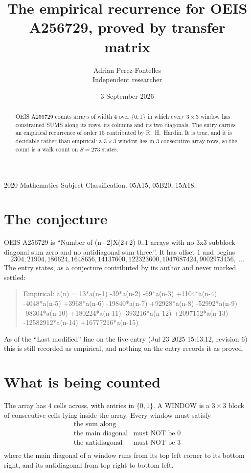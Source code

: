\documentclass[11pt,a4paper]{article}
\title{The empirical recurrence for OEIS A256729, proved by transfer matrix}
\author{Adrian Perez Fontelles\\ \small Independent researcher}
\date{3 September 2026}
\theoremstyle{plain}
\theoremstyle{definition}
\begin{document}
\maketitle

\begin{abstract}
OEIS A256729 counts arrays of width $4$ over $\{0,1\}$ in which every $3\times3$ window has
constrained SUMS along its rows, its columns and its two diagonals. The entry carries an
empirical recurrence of order $15$ contributed by R.~H.~Hardin. It is true, and it is
decidable rather than empirical: a $3\times3$ window lies in $3$ consecutive array rows,
so the count is a walk count on $S=273$ states.
\end{abstract}

\noindent\small 2020 Mathematics Subject Classification. 05A15, 05B20, 15A18.\normalsize

\section{The conjecture}

OEIS A256729 is ``Number of (n+2)X(2+2) 0..1 arrays with no 3x3 subblock diagonal sum zero and no antidiagonal sum three.''. It has offset $1$ and begins
\[
2304, 21904, 186624, 1648656, 14137600, 122323600, 1047687424, 9002973456,\ \dots
\]
The entry states, as a conjecture contributed by its author and never marked settled:
\begin{quote}
Empirical: a(n) = 13*a(n-1) -39*a(n-2) -69*a(n-3) +1104*a(n-4) -4048*a(n-5) +3968*a(n-6) -19840*a(n-7) +92928*a(n-8) -52992*a(n-9) -98304*a(n-10) +180224*a(n-11) -393216*a(n-12) +2097152*a(n-13) -12582912*a(n-14) +16777216*a(n-15)
\end{quote}
As of the ``Last modified'' line on the live entry (Jul 23 2025 15:13:12, revision 6) this is still
recorded as empirical, and nothing on the entry records it as proved.

\section{What is being counted}

The array has $4$ cells across, with entries in $\{0,1\}$. A WINDOW is a $3\times3$ block
of consecutive cells lying inside the array. Every window must satisfy
\[
\begin{array}{ll}
\text{the sum along} & \text{} \\[2pt]
\text{the main diagonal} & \text{must NOT be 0} \\
\text{the antidiagonal} & \text{must NOT be 3} \\
\end{array}
\]
where the main diagonal of a window runs from its top left corner to its bottom right, and its
antidiagonal from top right to bottom left.
\end{document}
